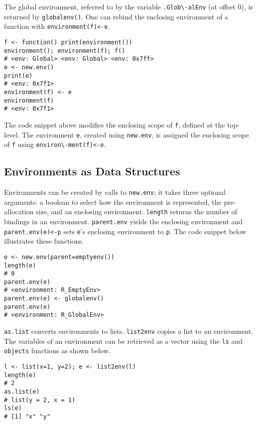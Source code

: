 \documentclass[sigplan,screen]{acmart}
\renewcommand{\c}[1]{\lstinline |#1|\xspace}
\newcommand{\newEnv}{\c{new.env}}
\newcommand{\asList}{\c{as.list}}
\newcommand{\listToEnv}{\c{list2env}}
\newcommand{\ls}{\c{ls}}
\newcommand{\objects}{\c{objects}}
\newcommand{\parentEnv}{\c{parent.env}}
\begin{document}
The global environment, referred to by the variable \c{.Glob\-alEnv} (at offset
0), is returned by \c{globalenv()}. One can rebind the enclosing environment of
a function with \c{environment(f)<-e}.

\begin{lstlisting}
f <- function() print(environment())
environment(); environment(f); f()
# <env: Global> <env: Global> <env: 0x7ff>
e <- new.env()
print(e)
# <env: 0x7f1>
environment(f) <- e
environment(f)
# <env: 0x7f1>
\end{lstlisting}

The code snippet above modifies the enclosing scope of \c{f}, defined at the
top-level. The environment \c{e}, created using \c{new.env}, is assigned the
enclosing scope of \c{f} using \c{environ\-ment(f)<-e}.

\subsection{Environments as Data Structures}

Environments can be created by calls to \newEnv; it takes three optional
arguments: a boolean to select how the environment is represented, the
pre-allocation size, and an enclosing environment. \c{length} returns the number
of bindings in an environment. \parentEnv yields the enclosing environment and
\c{parent.env(e)<-p} sets {\small\tt e}'s enclosing environment to \c{p}. The
code snippet below illustrates these functions.

\begin{lstlisting}
e <- new.env(parent=emptyenv())
length(e)
# 0
parent.env(e)
# <environment: R_EmptyEnv>
parent.env(e) <- globalenv()
parent.env(e)
# <environment: R_GlobalEnv>
\end{lstlisting}

\noindent
\asList converts environments to lists. \listToEnv copies a list to an
environment. The variables of an environment can be retrieved as a vector using
the \ls and \objects functions as shown below.

\begin{lstlisting}
l <- list(x=1, y=2); e <- list2env(l)
length(e)
# 2
as.list(e)
# list(y = 2, x = 1)
ls(e)
# [1] "x" "y"
\end{lstlisting}
\end{document}
